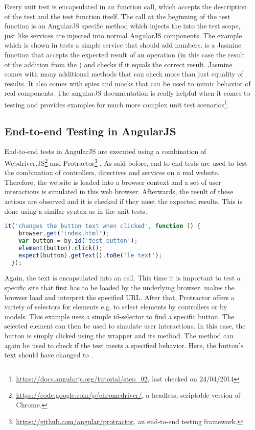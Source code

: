 Every unit test is encapsulated in an  function call, which accepts the description of the test and the test function itself. The  call at the beginning of the test function is an AngularJS specific method which injects the  into the test scope, just like services are injected into normal AngularJS components. The example which is shown in  tests a simple service that should add numbers.  is a Jasmine function that accepts the expected result of an operation (in this case the result of the addition from the ) and checks if it equals the correct result. Jasmine comes with many additional methods that can check more than just equality of results. It also comes with spies and mocks that can be used to mimic behavior of real components. The angularJS documentation is really helpful when it comes to testing and provides examples for much more complex unit test scenarios\footnote{\url{https://docs.angularjs.org/tutorial/step_02}, last checked on 24/04/2014}.

\subsection{End-to-end Testing in AngularJS}

End-to-end tests in AngularJS are executed using a combination of Webdriver.JS\footnote{\url{https://code.google.com/p/chromedriver/}, a headless, scriptable version of Chrome.} and Protractor\footnote{\url{https://github.com/angular/protractor}, an end-to-end testing framework.} \cite[chapter: E2E testing]{vermeersch2014}. As said before, end-to-end tests are used to test the combination of controllers, directives and services on a real website. Therefore, the website is loaded into a browser context and a set of user interactions is simulated in this web browser. Afterwards, the result of these actions are observed and it is checked if they meet the expected results. This is done using a similar syntax as in the unit tests.

\begin{lstlisting}[language=JavaScript, caption=Ent-to-end testing in AngularJS, label=lst:testing-e2e]
  it('changes the button text when clicked', function () {
    browser.get('index.html');
    var button = by.id('test-button');
    element(button).click();
    expect(button).getText().toBe('le text');
  });
\end{lstlisting}

Again, the text is encapsulated into an  call. This time it is important to test a specific site that first has to be loaded by the underlying browser.  makes the browser load and interpret the specified URL. After that, Protractor offers a variety of selectors for elements e.g. to select elements by controllers or by models. This example uses a simple id-selector to find a specific button. The selected element can then be used to simulate user interactions. In this case, the button is simply clicked using the  wrapper and its  method. The  method can again be used to check if the test meets a specified behavior. Here, the button's text should have changed to . 
